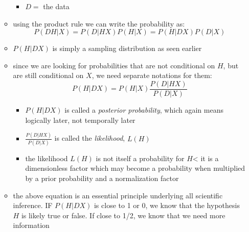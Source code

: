 \documentclass[../jaynes_prob_theory_notes.tex]{subfiles}
\begin{document}
\begin{itemize}
\begin{itemize}
\begin{itemize}
                    \item[] $D =$ the data
                \end{itemize}
            \item using the product rule we can write the probability as:
                \begin{equation*}
                    P(DH|X) = P(D|HX)P(H|X) = P(H|DX)P(D|X)
                \end{equation*}
            \item $P(H|DX)$ is simply a sampling distribution as seen earlier
            \item since we are looking for probabilities that are not conditional on $H$, but are still conditional on $X$, we need separate notations for them:
                \begin{equation}
                    \label{hyptest}
                    P(H|DX) = P(H|X)\frac{P(D|HX)}{P(D|X)}
                \end{equation}
                \begin{itemize}
                    \item $P(H|DX)$ is called a \textit{posterior probability}, which again means logically later, not temporally later
                    \item $\frac{P(D|HX)}{P(D|X)}$ is called the \textit{likelihood}, $L(H)$
                    \item the likelihood $L(H)$ is not itself a probability for $H$< it is a dimensionless factor which may become a probability when multiplied by a prior probability and a normalization factor
                \end{itemize}
            \item the above equation is an essential principle underlying all scientific inference. IF $P(H|DX)$ is close to 1 or 0, we know that the hypothesis $H$ is likely true or false. If close to 1/2, we know that we need more information
        \end{itemize}
\end{itemize}
\end{document}

